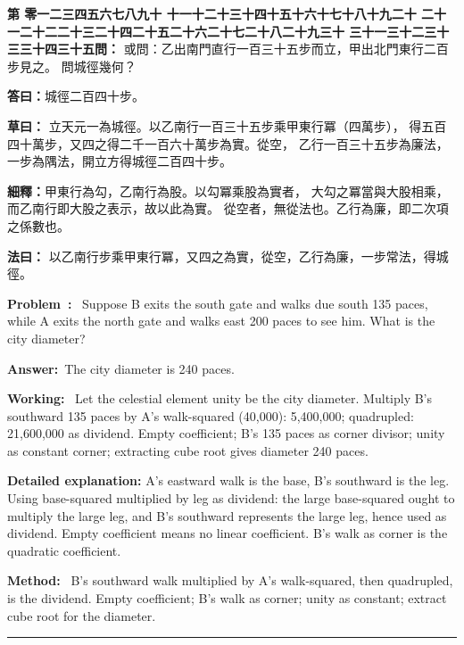 \documentclass[9pt,a4paper]{article}
\newcounter{probnum}
\newcounter{overallnum}
\newcommand{\chnum}[1]{%
  \ifcase#1 零\or 一\or 二\or 三\or 四\or 五\or 六\or 七\or 八\or 九\or 十\or
    十一\or 十二\or 十三\or 十四\or 十五\or 十六\or 十七\or 十八\or 十九\or 二十\or
    二十一\or 二十二\or 二十三\or 二十四\or 二十五\or 二十六\or 二十七\or 二十八\or 二十九\or 三十\or
    三十一\or 三十二\or 三十三\or 三十四\or 三十五\fi}
\newcommand{\problem}[1]{\stepcounter{probnum}\stepcounter{overallnum}\par\noindent\textbf{\color{volcolor}第\chnum{\value{probnum}}問：}#1\par\vspace{0.15cm}}
\newcommand{\answer}[1]{\par\noindent\textbf{答曰：}#1\par\vspace{0.15cm}}
\newcommand{\working}[1]{\par\noindent\textbf{草曰：}#1\par\vspace{0.15cm}}
\newcommand{\method}[1]{\par\noindent\textbf{法曰：}#1\par\vspace{0.25cm}}
\newcommand{\eproblem}[1]{\par\noindent\textbf{\color{volcolor}Problem~\theoverallnum:}~#1\par\vspace{0.15cm}}
\newcommand{\eanswer}[1]{\par\noindent\textbf{Answer:}~#1\par\vspace{0.15cm}}
\newcommand{\eworking}[1]{\par\noindent\textbf{Working:}~#1\par\vspace{0.15cm}}
\newcommand{\emethod}[1]{\par\noindent\textbf{Method:}~#1\par\vspace{0.25cm}}
\begin{document}
\noindent\begin{minipage}[t]{0.48\textwidth}
\problem{
或問：乙出南門直行一百三十五步而立，甲出北門東行二百步見之。
問城徑幾何？
}

\answer{城徑二百四十步。}

\working{
立天元一為城徑。以乙南行一百三十五步乘甲東行冪（四萬步），
得五百四十萬步，又四之得二千一百六十萬步為實。從空，
乙行一百三十五步為廉法，一步為隅法，開立方得城徑二百四十步。

\textbf{細釋：}甲東行為勾，乙南行為股。以勾冪乘股為實者，
大勾之冪當與大股相乘，而乙南行即大股之表示，故以此為實。
從空者，無從法也。乙行為廉，即二次項之係數也。
}

\method{
以乙南行步乘甲東行冪，又四之為實，從空，乙行為廉，一步常法，得城徑。
}
\end{minipage}%
\hfill%
\begin{minipage}[t]{0.50\textwidth}
\eproblem{
Suppose B exits the south gate and walks due south 135 paces, while A exits
the north gate and walks east 200 paces to see him. What is the city diameter?
}

\eanswer{The city diameter is 240 paces.}

\eworking{
Let the celestial element unity be the city diameter. Multiply B's southward
135 paces by A's walk-squared (40,000): 5,400,000; quadrupled:
21,600,000 as dividend. Empty coefficient; B's 135 paces as corner divisor;
unity as constant corner; extracting cube root gives diameter 240 paces.

\textbf{Detailed explanation:} A's eastward walk is the base, B's southward is
the leg. Using base-squared multiplied by leg as dividend: the large base-squared
ought to multiply the large leg, and B's southward represents the large leg,
hence used as dividend. Empty coefficient means no linear coefficient. B's walk
as corner is the quadratic coefficient.
}

\emethod{
B's southward walk multiplied by A's walk-squared, then quadrupled, is the
dividend. Empty coefficient; B's walk as corner; unity as constant;
extract cube root for the diameter.
}
\end{minipage}
\vspace{0.15cm}

\vspace{0.15cm}
\noindent\rule{\textwidth}{0.2pt}
\vspace{0.15cm}
\end{document}

